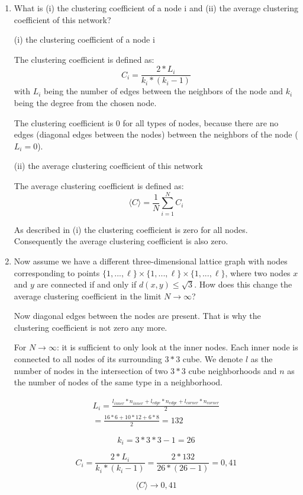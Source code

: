 \begin{enumerate}
	\item What is (i) the clustering coefficient of a node i and (ii) the average clustering coefficient of this network?
	\vspace{0.25cm}
	
	(i) the clustering coefficient of a node i
	
	The clustering coefficient is defined as:
	\begin{equation*}
		C_i = \frac{2*L_i}{k_i * (k_i-1)}
	\end{equation*}
	with $L_i$ being the number of edges between the neighbors of the node and $k_i$ being the degree from the chosen node.
	
	The clustering coefficient is 0 for all types of nodes, because there are no edges (diagonal edges between the nodes) between the neighbors of the node ($L_i = 0$).
	
	(ii) the average clustering coefficient of this network
	
	The average clustering coefficient is defined as:
	\begin{equation*}
		\langle C \rangle = \frac{1}{N} \sum_{i=1}^{N} C_i
	\end{equation*}
	
	As described in (i) the clustering coefficient is zero for all nodes. Con\-se\-quent\-ly the average clustering coefficient is also zero.
	
	\item Now assume we have a different three-dimensional lattice graph with nodes corresponding to points $\{1,...,\ell\}\times\{1,...,\ell\}\times\{1,...,\ell\}$, where two nodes $x$ and $y$ are connected if and only if $d(x,y) \leq \sqrt{3}$. How does this change the average clustering coefficient in the limit $N \rightarrow \infty$?
	\vspace{0.25cm}
	
	Now diagonal edges between the nodes are present. That is why the clustering coefficient is not zero any more.
	
	For $N \rightarrow \infty$: it is sufficient to only look at the inner nodes. Each inner node is connected to all nodes of its surrounding $3*3$ cube. We denote $l$ as the number of nodes in the intersection of two $3*3$ cube neighborhoods and $n$ as the number of nodes of the same type in a neighborhood. 
	
	\begin{align*}
		L_i = \frac{l_{inner}*n_{inner} + l_{edge}*n_{edge} + l_{corner}*n_{corner}}{2} \\
		= \frac{16*6 + 10*12 + 6*8}{2} = 132
	\end{align*}
	
	\begin{equation*}
		k_i = 3*3*3-1 = 26
	\end{equation*}
	
	\begin{equation*}
		C_i = \frac{2*L_i}{k_i * (k_i-1)} = \frac{2*132}{26 * (26-1)} = 0,41
	\end{equation*}
	
	\begin{equation*}
		\langle C \rangle \rightarrow 0,41
	\end{equation*}
	
\end{enumerate}